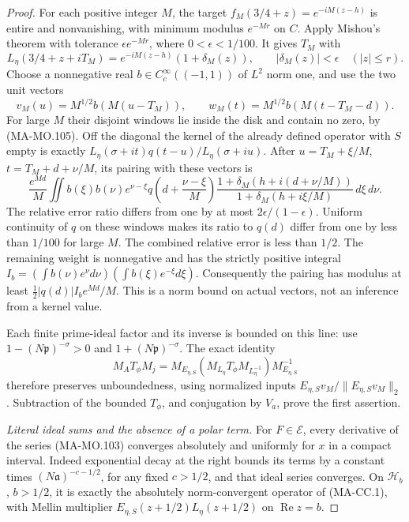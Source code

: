 \begin{proof}
For each positive integer \(M\), the target
\(f_M(3/4+z)=e^{-iM(z-h)}\) is entire and nonvanishing,
with minimum modulus \(e^{-Mr}\) on \(C\).
Apply Mishou's theorem with tolerance
\(\epsilon e^{-Mr}\), where \(0<\epsilon<1/100\).
It gives \(T_M\) with
\[
 L_\eta(3/4+z+iT_M)
   =e^{-iM(z-h)}(1+\delta_M(z)),\qquad
      |\delta_M(z)|<\epsilon\quad(|z|\le r).
 \tag{MA-MO.105}
\]
Choose a nonnegative real \(b\in C_c^\infty((-1,1))\)
of \(L^2\) norm one, and use the two unit vectors
\[
 v_M(u)=M^{1/2}b(M(u-T_M)),\qquad
 w_M(t)=M^{1/2}b(M(t-T_M-d)).
 \tag{MA-MO.106}
\]
For large \(M\) their disjoint windows lie inside the
disk and contain no zero, by (MA-MO.105). Off the diagonal
the kernel of the already defined operator with \(S\) empty
is exactly
\(L_\eta(\sigma+it)q(t-u)/L_\eta(\sigma+iu)\).
After \(u=T_M+\xi/M\), \(t=T_M+d+\nu/M\), its pairing
with these vectors is
\[
 \frac{e^{Md}}{M}\iint b(\xi)b(\nu)e^{\nu-\xi}
 q\!\left(d+\frac{\nu-\xi}{M}\right)
 \frac{1+\delta_M(h+i(d+\nu/M))}
      {1+\delta_M(h+i\xi/M)}\,d\xi\,d\nu.
 \tag{MA-MO.107}
\]
The relative error ratio differs from one by at most
\(2\epsilon/(1-\epsilon)\). Uniform continuity of \(q\)
on these windows makes its ratio to \(q(d)\) differ from
one by less than \(1/100\) for large \(M\). The combined
relative error is less than \(1/2\). The remaining weight
is nonnegative and has the strictly positive integral
\(I_b=(\int b(\nu)e^\nu d\nu)(\int b(\xi)e^{-\xi}d\xi)\).
Consequently the pairing has modulus at least
\(\tfrac12|q(d)|I_b e^{Md}/M\). This is a norm bound
on actual vectors, not an inference from a kernel value.

Each finite prime-ideal factor and its inverse is bounded
on this line: use \(1-(N\mathfrak p)^{-\sigma}>0\)
and \(1+(N\mathfrak p)^{-\sigma}\). The exact identity
\[
 M_A T_\phi M_j
  =M_{E_{\eta,S}}
       (M_{L_\eta}T_\phi M_{L_\eta^{-1}})
                               M_{E_{\eta,S}}^{-1}
 \tag{MA-MO.108}
\]
therefore preserves unboundedness, using normalized inputs
\(E_{\eta,S}v_M/\|E_{\eta,S}v_M\|_2\). Subtraction of
the bounded \(T_\phi\), and conjugation by \(V_a\), prove
the first assertion.

\emph{Literal ideal sums and the absence of a polar term.}
For \(F\in\mathcal E\), every derivative of the series
(MA-MO.103) converges absolutely and uniformly for \(x\)
in a compact interval. Indeed exponential decay at the
right bounds its terms by a constant times
\((N\mathfrak a)^{-c-1/2}\), for any fixed \(c>1/2\),
and that ideal series converges. On \(\mathcal H_b\),
\(b>1/2\), it is exactly the absolutely norm-convergent
operator of (MA-CC.1), with Mellin multiplier
\(E_{\eta,S}(z+1/2)L_\eta(z+1/2)\) on
\(\operatorname{Re}z=b\).


\end{proof}
